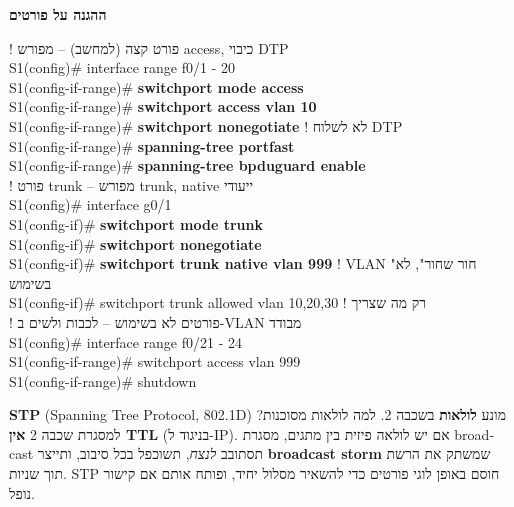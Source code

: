 \documentclass[11pt]{article}
\newcommand{\enLR}[1]{\textenglish{#1}}
\newcommand{\sectionheading}[1]{\vskip10pt\penalty-200{\large\bfseries\color{h2}#1\par}\vskip3pt}
\newcommand{\subheading}[1]{\vskip6pt{\bfseries\color{h3}#1\par}\vskip2pt}
\begin{document}
\subheading{ההגנה על פורטים}

\begin{codebox}\begin{english}\codefont\footnotesize\color{cfg}\setlength{\parindent}{0pt}
\textcolor{ccom}{\texthebrew{! פורט קצה (למחשב) – מפורש \enLR{access}, כיבוי \enLR{DTP}}}\\
S1(config)\# interface range f0/1 - 20\\
S1(config-if-range)\# \textcolor{cbold}{\textbf{switchport mode access}}\\
S1(config-if-range)\# \textcolor{cbold}{\textbf{switchport access vlan 10}}\\
S1(config-if-range)\# \textcolor{cbold}{\textbf{switchport nonegotiate}}          \textcolor{ccom}{\texthebrew{! לא לשלוח \enLR{DTP}}}\\
S1(config-if-range)\# \textcolor{cbold}{\textbf{spanning-tree portfast}}\\
S1(config-if-range)\# \textcolor{cbold}{\textbf{spanning-tree bpduguard enable}}\\
\textcolor{ccom}{\texthebrew{! פורט \enLR{trunk} – מפורש \enLR{trunk, native} ייעודי}}\\
S1(config)\# interface g0/1\\
S1(config-if)\# \textcolor{cbold}{\textbf{switchport mode trunk}}\\
S1(config-if)\# \textcolor{cbold}{\textbf{switchport nonegotiate}}\\
S1(config-if)\# \textcolor{cbold}{\textbf{switchport trunk native vlan 999}}       \textcolor{ccom}{\texthebrew{! \enLR{VLAN "}חור שחור", לא בשימוש}}\\
S1(config-if)\# switchport trunk allowed vlan 10,20,30      \textcolor{ccom}{\texthebrew{! רק מה שצריך}}\\
\textcolor{ccom}{\texthebrew{! פורטים לא בשימוש – לכבות ולשים ב-\enLR{VLAN} מבודד}}\\
S1(config)\# interface range f0/21 - 24\\
S1(config-if-range)\# switchport access vlan 999\\
S1(config-if-range)\# shutdown
\end{english}\end{codebox}

\sectionheading{\enLR{6.5 STP} והתקפות עליו}

\textbf{\enLR{STP}} \enLR{(Spanning Tree Protocol, 802.1D)} מונע \textbf{לולאות} בשכבה \enLR{2.} למה לולאות מסוכנות? למסגרת שכבה \enLR{2} \textbf{אין \enLR{TTL}} (בניגוד ל-\enLR{IP).} אם יש לולאה פיזית בין מתגים, מסגרת \enLR{broadcast} תסתובב \emph{לנצח}, תשוכפל בכל סיבוב, ותייצר \textbf{\enLR{broadcast storm}} שמשתק את הרשת תוך שניות. \enLR{STP} חוסם באופן לוגי פורטים כדי להשאיר מסלול יחיד, ופותח אותם אם קישור נופל.\par
\end{document}
